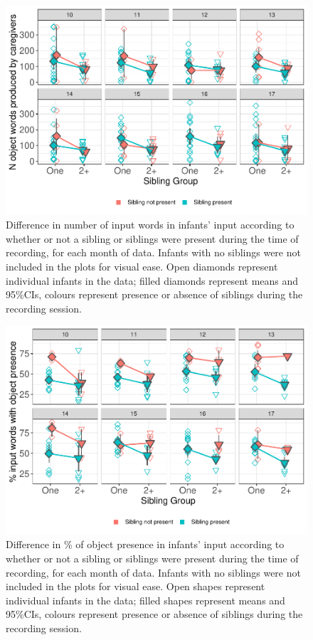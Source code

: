 \documentclass[
  man,floatsintext]{apa6}
\begin{document}
\begin{figure}
\centering
\includegraphics{SiblingsStudyText-final_files/figure-latex/figure-sibpresence-input-1.pdf}
\caption{\label{fig:figure-sibpresence-input}Difference in number of input words in infants' input according to whether or not a sibling or siblings were present during the time of recording, for each month of data. Infants with no siblings were not included in the plots for visual ease. Open diamonds represent individual infants in the data; filled diamonds represent means and 95\%CIs, colours represent presence or absence of siblings during the recording session.}
\end{figure}

\begin{figure}
\centering
\includegraphics{SiblingsStudyText-final_files/figure-latex/figure-sibpresence-obj-1.pdf}
\caption{\label{fig:figure-sibpresence-obj}Difference in \% of object presence in infants' input according to whether or not a sibling or siblings were present during the time of recording, for each month of data. Infants with no siblings were not included in the plots for visual ease. Open shapes represent individual infants in the data; filled shapes represent means and 95\%CIs, colours represent presence or absence of siblings during the recording session.}
\end{figure}
\end{document}
